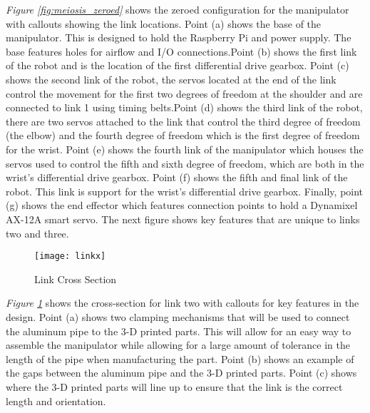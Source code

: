 \emph{Figure \ref{fig:meiosis_zeroed}} shows the zeroed configuration for the manipulator with callouts showing the link locations. Point (a) shows the base of the manipulator. This is designed to hold the Raspberry Pi and power supply. The base features holes for airflow and I/O connections.Point (b) shows the first link of the robot and is the location of the first differential drive gearbox. Point (c) shows the second link of the robot, the servos located at the end of the link control the movement for the first two degrees of freedom at the shoulder and are connected to link 1 using timing belts.Point (d) shows the third link of the robot, there are two servos attached to the link that control the third degree of freedom (the elbow) and the fourth degree of freedom which is the first degree of freedom for the wrist. Point (e) shows the fourth link of the manipulator which houses the servos used to control the fifth and sixth degree of freedom, which are both in the wrist’s differential drive gearbox. Point (f) shows the fifth and final link of the robot. This link is support for the wrist’s differential drive gearbox. Finally, point (g) shows the end effector which features connection points to hold a Dynamixel AX-12A smart servo. The next figure shows key features that are unique to links two and three.

\begin{figure}[htp]
  \center
  \texttt{[image: linkx]}
  \caption{Link Cross Section}
  \label{fig:linkx}
\end{figure}

\emph{Figure \ref{fig:linkx}} shows the cross-section for link two with callouts for key features in the design. Point (a) shows two clamping mechanisms that will be used to connect the aluminum pipe to the 3-D printed parts. This will allow for an easy way to assemble the manipulator while allowing for a large amount of tolerance in the length of the pipe when manufacturing the part. Point (b) shows an example of the gaps between the aluminum pipe and the 3-D printed parts. Point (c) shows where the 3-D printed parts will line up to ensure that the link is the correct length and orientation.

